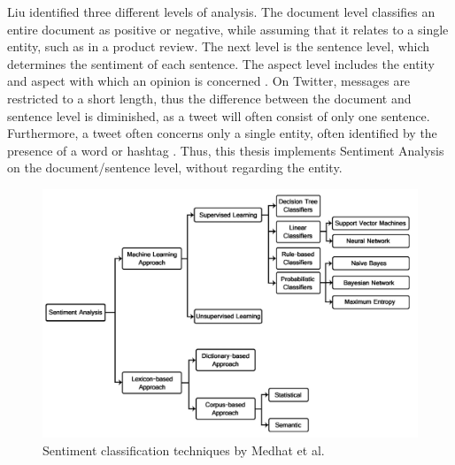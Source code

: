 Liu identified three different levels of analysis. The document level classifies an entire document as positive or negative, while assuming that it relates to a single entity, such as in a product review. The next level is the sentence level, which determines the sentiment of each sentence. The aspect level includes the entity and aspect with which an opinion is concerned \cite{liu_2015}. On Twitter, messages are restricted to a short length, thus the difference between the document and sentence level is diminished, as a tweet will often consist of only one sentence. Furthermore, a tweet often concerns only a single entity, often identified by the presence of a word or hashtag \cite{DBLP:journals/csur/GiachanouC16}. Thus, this thesis implements Sentiment Analysis on the document/sentence level, without regarding the entity.
\begin{figure}
    \centering
    \includegraphics[scale=0.3]{Images/classification_techniques.png}
    \caption{Sentiment classification techniques by Medhat et al. \cite{MEDHAT20141093}}
    \label{fig:classifiers}
\end{figure}

